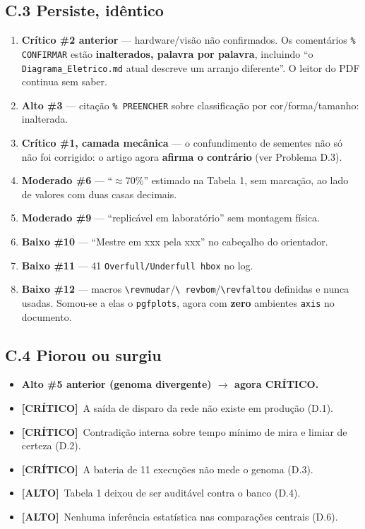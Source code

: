 \documentclass[11pt,a4paper]{article}
\newcommand{\critico}{\textbf{\color{red!60!black}[CRÍTICO]}}
\newcommand{\alto}{\textbf{\color{orange!70!black}[ALTO]}}
\begin{document}
\subsection*{C.3 Persiste, idêntico}

\begin{enumerate}
  \item \textbf{Crítico \#2 anterior} --- hardware/visão não confirmados. Os comentários
  \texttt{\% CONFIRMAR} estão \textbf{inalterados, palavra por palavra}, incluindo ``o
  \texttt{Diagrama\_Eletrico.md} atual descreve um arranjo diferente''. O leitor do PDF continua sem
  saber.
  \item \textbf{Alto \#3} --- citação \texttt{\% PREENCHER} sobre classificação por cor/forma/tamanho:
  inalterada.
  \item \textbf{Crítico \#1, camada mecânica} --- o confundimento de sementes não só não foi
  corrigido: o artigo agora \textbf{afirma o contrário} (ver Problema D.3).
  \item \textbf{Moderado \#6} --- ``$\approx$70\%'' estimado na Tabela 1, sem marcação, ao lado de
  valores com duas casas decimais.
  \item \textbf{Moderado \#9} --- ``replicável em laboratório'' sem montagem física.
  \item \textbf{Baixo \#10} --- ``Mestre em xxx pela xxx'' no cabeçalho do orientador.
  \item \textbf{Baixo \#11} --- 41 \texttt{Overfull/Underfull hbox} no log.
  \item \textbf{Baixo \#12} --- macros \texttt{\textbackslash revmudar}/\texttt{\textbackslash
  revbom}/\texttt{\textbackslash revfaltou} definidas e nunca usadas. Somou-se a elas o
  \texttt{pgfplots}, agora com \textbf{zero} ambientes \texttt{axis} no documento.
\end{enumerate}

\subsection*{C.4 Piorou ou surgiu}

\begin{itemize}
  \item \textbf{Alto \#5 anterior (genoma divergente) $\rightarrow$ agora CRÍTICO.}
  \item \critico\ A saída de disparo da rede não existe em produção (D.1).
  \item \critico\ Contradição interna sobre tempo mínimo de mira e limiar de certeza (D.2).
  \item \critico\ A bateria de 11 execuções não mede o genoma (D.3).
  \item \alto\ Tabela 1 deixou de ser auditável contra o banco (D.4).
  \item \alto\ Nenhuma inferência estatística nas comparações centrais (D.6).
\end{itemize}
\end{document}
